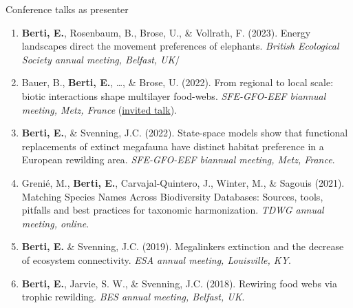 \documentclass{resume} %
\begin{document}
\begin{rSection}{Conference talks as presenter}
\begin{enumerate}
    \setlength\itemsep{-0.5em}
    \item \textbf{Berti, E.}, Rosenbaum, B., Brose, U., \& Vollrath, F. (2023). Energy landscapes direct the movement preferences of elephants. \textit{British Ecological Society annual meeting, Belfast, UK}/
    \item Bauer, B., \textbf{Berti, E.}, \dots, \& Brose, U. (2022). From regional to local scale: biotic interactions shape multilayer food-webs. \textit{SFE-GFO-EEF biannual meeting, Metz, France} (\underline{invited talk}).
    \item \textbf{Berti, E.}, \& Svenning, J.C. (2022). State-space models show that functional replacements of extinct megafauna have distinct habitat preference in a European rewilding area. \textit{SFE-GFO-EEF biannual meeting, Metz, France}.
    \item Grenié, M., \textbf{Berti, E.}, Carvajal-Quintero, J., Winter, M., \& Sagouis (2021). Matching Species Names Across Biodiversity Databases: Sources, tools, pitfalls and best practices for taxonomic harmonization. \textit{TDWG annual meeting, online}.
    \item \textbf{Berti, E.} \& Svenning, J.C. (2019). Megalinkers extinction and the decrease of ecosystem connectivity. \textit{ESA annual meeting, Louisville, KY}.
    \item \textbf{Berti, E.}, Jarvie, S. W., \& Svenning, J.C. (2018). Rewiring food webs via trophic rewilding. \textit{BES annual meeting, Belfast, UK}.
\end{enumerate}
\end{rSection}
\end{document}

